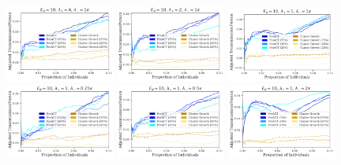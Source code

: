 \documentclass[a4paper,11pt]{article}
\begin{document}
\begin{figure}[!h]
\centering
\includegraphics[width=0.32\textwidth]{figs/results_efficacy_normalized_individual_SAMPLE-FIRSTART_ARTRATE-4.pdf}
\includegraphics[width=0.32\textwidth]{figs/results_efficacy_normalized_individual_SAMPLE-FIRSTART_ARTRATE-2.pdf}
\includegraphics[width=0.32\textwidth]{figs/results_efficacy_normalized_individual_SAMPLE-FIRSTART_ARTRATE-1.pdf}\\
\includegraphics[width=0.32\textwidth]{figs/results_efficacy_normalized_individual_SAMPLE-FIRSTART_STOPRATE-0.25x.pdf}
\includegraphics[width=0.32\textwidth]{figs/results_efficacy_normalized_individual_SAMPLE-FIRSTART_STOPRATE-0.5x.pdf}
\includegraphics[width=0.32\textwidth]{figs/results_efficacy_normalized_individual_SAMPLE-FIRSTART_STOPRATE-2x.pdf}\\

\end{figure}
\end{document}

